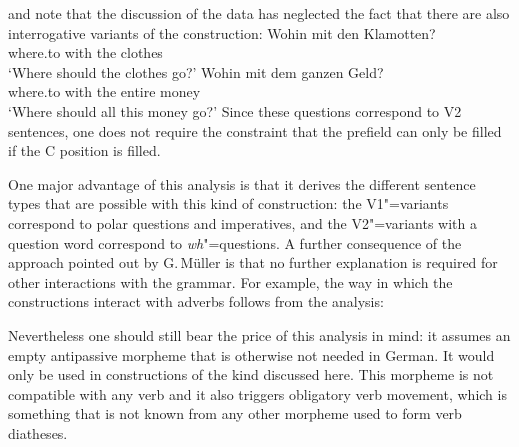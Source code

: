 \begin{exe}
\begin{xlist}[iv.]
\begin{exe}
\begin{xlist}[iv.]
\begin{figure}
\end{figure}%
\citet{Budde2010a} and \citet{Mache2010a} note that the discussion of the data has neglected the fact that there are also interrogative variants
of the construction:
\eal
\ex 
\gll Wohin mit den Klamotten?\\
	 where.to with the clothes\\
\glt `Where should the clothes go?'
\ex 
\gll Wohin mit dem ganzen Geld?\\
	 where.to with the entire money\\
\glt `Where should all this money go?'
\zl
Since these questions correspond to V2 sentences, one does not require the constraint that the prefield can only be filled if the C position
is filled. 

One major advantage of this analysis is that it derives the different sentence types that are possible with this kind of construction:
the V1"=variants correspond to polar questions and imperatives, and the V2"=variants with a question word correspond to \emph{wh}"=questions.
A further consequence of the approach pointed out by G.\,Müller is that no further explanation is required for
other interactions with the grammar. For example, the way in which the constructions interact with adverbs follows from the analysis:
{
\eal
{}
\zl
\eal
{}
\zl}

\noindent
Nevertheless one should still bear the price of this analysis in mind: it assumes an empty antipassive morpheme that is otherwise not
needed in German. It would only be used in constructions of the kind discussed here. This morpheme is not compatible with
any verb and it also triggers obligatory verb movement, which is something that is not known from any other morpheme used
to form verb diatheses.


\end{xlist}
\end{exe}
\end{xlist}
\end{exe}
